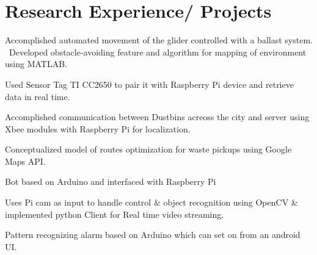 \documentclass[letterpaper]{akhilesh}
\begin{document}
\begin{minipage}[t]{0.599\textwidth} 



\section{Research Experience/ Projects}

\vspace{\topsep}
\begin{tightemize}
\item Accomplished automated movement of the glider controlled with a ballast system.
\ Developed obstacle-avoiding feature and algorithm for mapping of environment using MATLAB.
\item Used Sensor Tag TI CC2650 to pair it with Raspberry Pi device and retrieve data in real time.
\end{tightemize}
\sectionsep


\begin{tightemize}
\item Accomplished communication between Dustbins acreoss the city and server using Xbee modules with Raspberry Pi for localization.
\item Conceptualized model of routes optimization for waste pickups using Google Maps API.
\end{tightemize}
\sectionsep

\begin{tightemize}
\item Bot based on Arduino and interfaced with Raspberry Pi 
\item Uses Pi cam as input to handle control \& object recognition using OpenCV \& implemented python Client for Real time video streaming.
\end{tightemize}
\sectionsep

\begin{tightemize}
\item Pattern recognizing alarm based on Arduino which can set on from an android UI.
\end{tightemize}
\sectionsep


\end{minipage}
\end{document}
